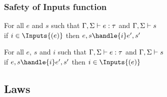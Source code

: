 \subsubsection{Safety of Inputs function}

\begin{theorem}
  For all $e$ and $s$ such that $\Gamma,\Sigma\vdash e:\tau$ and $\Gamma,\Sigma\vdash s$\\
  if $i\in\Inputs{(e)}$ then $e,s\handle{i}e',s'$
  \label{thmsafetyi1}
\end{theorem}

\begin{theorem}
  For all $e$, $s$ and $i$ such that $\Gamma,\Sigma\vdash e:\tau$ and $\Gamma,\Sigma\vdash s$\\
  if $e,s\handle{i}e',s'$ then  $i\in\Inputs{(e)}$
  \label{thmsafetyi2}
\end{theorem}
\subsection{Laws}
